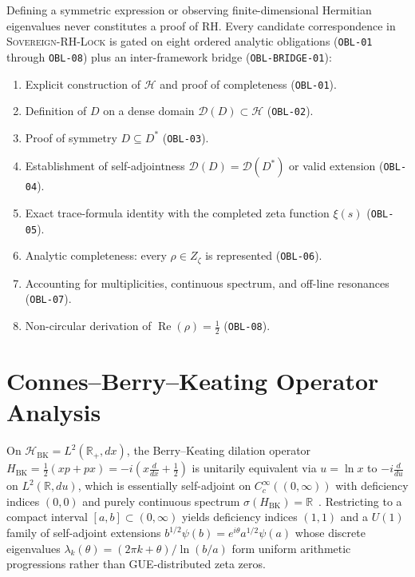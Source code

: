 \documentclass[11pt,letterpaper]{article}
\begin{document}
Defining a symmetric expression or observing finite-dimensional Hermitian eigenvalues never constitutes a proof of RH. Every candidate correspondence in \textsc{Sovereign-RH-Lock} is gated on eight ordered analytic obligations (\texttt{OBL-01} through \texttt{OBL-08}) plus an inter-framework bridge (\texttt{OBL-BRIDGE-01}):
\begin{enumerate}
    \item Explicit construction of $\mathcal{H}$ and proof of completeness (\texttt{OBL-01}).
    \item Definition of $D$ on a dense domain $\mathcal{D}(D) \subset \mathcal{H}$ (\texttt{OBL-02}).
    \item Proof of symmetry $D \subseteq D^*$ (\texttt{OBL-03}).
    \item Establishment of self-adjointness $\mathcal{D}(D) = \mathcal{D}(D^*)$ or valid extension (\texttt{OBL-04}).
    \item Exact trace-formula identity with the completed zeta function $\xi(s)$ (\texttt{OBL-05}).
    \item Analytic completeness: every $\rho \in Z_\zeta$ is represented (\texttt{OBL-06}).
    \item Accounting for multiplicities, continuous spectrum, and off-line resonances (\texttt{OBL-07}).
    \item Non-circular derivation of $\operatorname{Re}(\rho) = \frac{1}{2}$ (\texttt{OBL-08}).
\end{enumerate}

\section{Connes--Berry--Keating Operator Analysis}

On $\mathcal{H}_{\mathrm{BK}} = L^2(\mathbb{R}_+, dx)$, the Berry--Keating dilation operator $H_{\mathrm{BK}} = \frac{1}{2}(xp + px) = -i(x\frac{d}{dx} + \frac{1}{2})$ is unitarily equivalent via $u = \ln x$ to $-i\frac{d}{du}$ on $L^2(\mathbb{R}, du)$, which is essentially self-adjoint on $C_c^\infty((0,\infty))$ with deficiency indices $(0,0)$ and purely continuous spectrum $\sigma(H_{\mathrm{BK}}) = \mathbb{R}$~\cite{berry1999}. Restricting to a compact interval $[a,b] \subset (0,\infty)$ yields deficiency indices $(1,1)$ and a $U(1)$ family of self-adjoint extensions $b^{1/2}\psi(b) = e^{i\theta}a^{1/2}\psi(a)$ whose discrete eigenvalues $\lambda_k(\theta) = (2\pi k + \theta)/\ln(b/a)$ form uniform arithmetic progressions rather than GUE-distributed zeta zeros.
\end{document}
